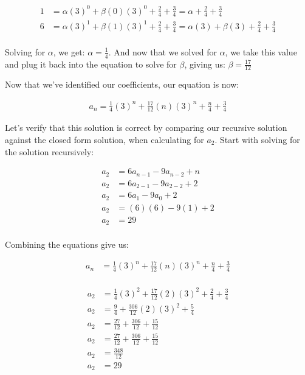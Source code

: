 \documentclass{article}
\begin{document}
\begin{align*}
1 &= \alpha(3)^0 + \beta(0)(3)^0 + \frac{2}{4} + \frac{3}{4} = \alpha + \frac{2}{4} + \frac{3}{4} \\
6 &= \alpha(3)^1 + \beta(1)(3)^1 + \frac{2}{4} + \frac{3}{4} = \alpha(3) + \beta(3) + \frac{2}{4} + \frac{3}{4} \\
\end{align*}

Solving for $\alpha$, we get: $\alpha = \frac{1}{4}$. And now that we solved for $\alpha$, we take this value and plug it back into the equation to solve for $\beta$, giving us: $\beta = \frac{17}{12}$

Now that we've identified our coefficients, our equation is now:

\begin{align*}
a_n = \frac{1}{4}(3)^n + \frac{17}{12}(n)(3)^n + \frac{n}{4} + \frac{3}{4}
\end{align*}

Let's verify that this solution is correct by comparing our recursive solution against the closed form solution, when calculating for $a_2$. Start with solving for the solution recursively:

\begin{align*}
    a_2 &= 6a_{n-1} - 9a_{n-2} + n \\
    a_2 &= 6a_{2-1} - 9a_{2-2} + 2 \\
    a_2 &= 6a_{1} - 9a_{0} + 2 \\
    a_2 &= (6)(6) - 9(1) + 2 \\
    a_2 &= 29 \\
\end{align*}

Combining the equations give us:

\begin{align*}
a_n & = \frac{1}{4}(3)^n + \frac{17}{12}(n)(3)^n + \frac{n}{4} + \frac{3}{4} \\
\end{align*}

\begin{align*}
a_2 & = \frac{1}{4}(3)^2 + \frac{17}{12}(2)(3)^2 + \frac{2}{4} + \frac{3}{4} \\
a_2 & = \frac{9}{4} + \frac{306}{12}(2)(3)^2 + \frac{5}{4} \\
a_2 & = \frac{27}{12} + \frac{306}{12} + \frac{15}{12} \\
a_2 & = \frac{27}{12} + \frac{306}{12} + \frac{15}{12} \\
a_2 & = \frac{348}{12} \\
a_2 & = 29 \\
\end{align*}
\end{document}
